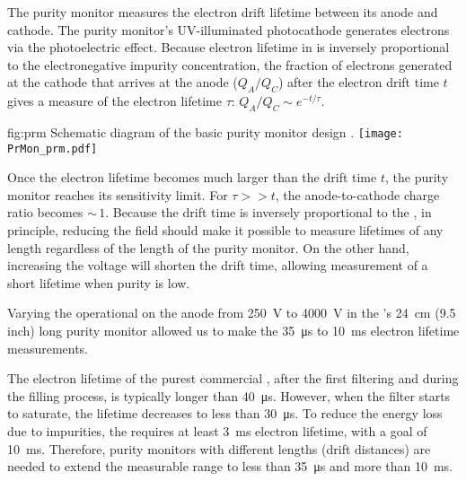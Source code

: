 The purity monitor measures the electron drift lifetime between its anode and cathode. The purity monitor's UV-illuminated %
photocathode generates electrons via the photoelectric effect. Because electron lifetime in \lar is inversely proportional to the electronegative impurity concentration, the fraction of electrons generated at the cathode that arrives at the anode ($Q_A/Q_C$) after the electron drift time $t$ gives a measure of the electron lifetime $\tau$:
%
\( Q_A/Q_C \sim e^{-t/\tau}.\)



\begin{dunefigure}{fig:prm}
  {Schematic diagram of the basic purity monitor design \cite{Adamowski:2014daa}.}
  \texttt{[image: PrMon\_prm.pdf]}
\end{dunefigure}



Once the electron lifetime becomes much larger than the drift time $t$, the purity monitor reaches its sensitivity limit.  For $\tau >> t$, the anode-to-cathode charge ratio becomes $\sim\,1$. Because the drift time is inversely proportional to the \efield, in principle, reducing the %
field should make it possible to measure lifetimes of any length regardless of the length of the purity monitor.
On the other hand, increasing the voltage will shorten the drift time, allowing measurement of a short lifetime when purity is low. 


Varying the operational  on the anode from \SI{250}{V} to \SI{4000}{V} in the 's \SI{24}{cm} (9.5 inch) long purity monitor allowed us to make the \SI{35}{\micro\second} to \SI{10}{\milli\second} electron lifetime measurements. 

The electron lifetime of the purest commercial \lar, after the first filtering and during the filling process, is typically longer than \SI{40}{\micro\second}. However, when the filter starts to saturate, the lifetime decreases to less than \SI{30}{\micro\second}.  To %
reduce the energy loss due to impurities,  the  requires 
at least \SI{3}{\milli\second} electron lifetime, with a goal of \SI{10}{\milli\second}. 
Therefore, purity monitors with different lengths (drift distances) are needed to extend the measurable range to less than \SI{35}{\micro\second} and more than  \SI{10}{\milli\second}.


